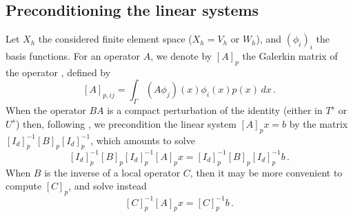 \documentclass[a4paper]{article}
\begin{document}
%
%
\subsection{Preconditioning the linear systems}
Let $X_h$ the considered finite element space ($X_h = V_h$ or $W_h$), and $(\phi_i)_{i}$ the basis functions. For an operator $A$, we denote by $\left[A\right]_p$ 
the Galerkin matrix of the operator , defined by
$$
[A]_{p,ij} = \int_\Gamma (A\phi_j)(x) \phi_i(x) p(x)\,dx\,.
$$
When the operator $BA$ is a compact perturbation of the identity (either in $T^s$ or $U^s$) then, following \cite{steinbach1998construction}, we 
precondition the linear system $\left[A\right]_p x = b$ by the matrix $\left[I_d\right]^{-1}_p \left[B\right]_p \left[I_d\right]_p^{-1}$, which amounts to solve
$$
\left[I_d\right]^{-1}_p \left[B\right]_p \left[I_d\right]_p^{-1} [A]_p x = \left[I_d\right]^{-1}_p \left[B\right]_p \left[I_d\right]_p^{-1} b\,.
$$
When $B$ is the inverse of a local operator $C$, then it may be more convenient to compute $\left[C\right]_p$, and solve instead
$$
\left[C\right]_p^{-1}[A]_p x = \left[C\right]_p^{-1}b\,.
$$
\end{document}

